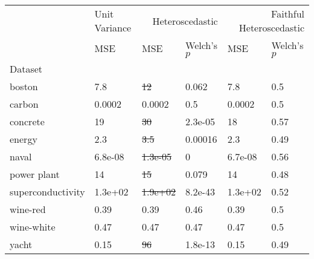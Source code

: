 \begin{tabular}{l|l|ll|ll}
\toprule
 & Unit Variance & \multicolumn{2}{r}{Heteroscedastic} & \multicolumn{2}{r}{Faithful Heteroscedastic} \\
 & MSE & MSE & Welch's $p$ & MSE & Welch's $p$ \\
Dataset &  &  &  &  &  \\
\midrule
boston & 7.8 & \sout{12} & 0.062 & 7.8 & 0.5 \\
carbon & 0.0002 & 0.0002 & 0.5 & 0.0002 & 0.5 \\
concrete & 19 & \sout{30} & 2.3e-05 & 18 & 0.57 \\
energy & 2.3 & \sout{3.5} & 0.00016 & 2.3 & 0.49 \\
naval & 6.8e-08 & \sout{1.3e-05} & 0 & 6.7e-08 & 0.56 \\
power plant & 14 & \sout{15} & 0.079 & 14 & 0.48 \\
superconductivity & 1.3e+02 & \sout{1.9e+02} & 8.2e-43 & 1.3e+02 & 0.52 \\
wine-red & 0.39 & 0.39 & 0.46 & 0.39 & 0.5 \\
wine-white & 0.47 & 0.47 & 0.47 & 0.47 & 0.5 \\
yacht & 0.15 & \sout{96} & 1.8e-13 & 0.15 & 0.49 \\
\bottomrule
\end{tabular}
